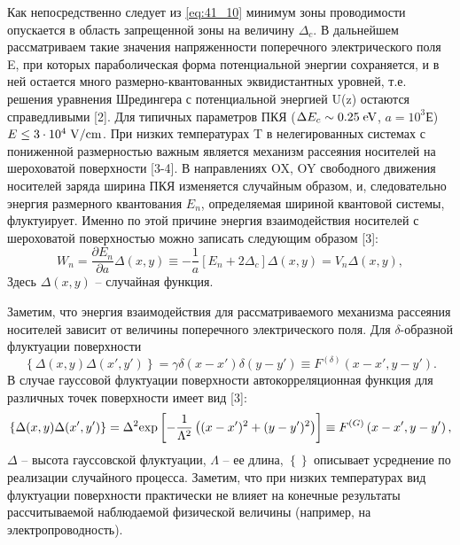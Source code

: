 Как непосредственно следует из \eqref{eq:41_10} минимум зоны проводимости опускается в область запрещенной зоны на величину $\Delta _{c} $. В дальнейшем рассматриваем такие значения напряженности поперечного электрического поля E, при которых параболическая форма потенциальной энергии сохраняется, и в ней остается много размерно-квантованных эквидистантных уровней, т.е. решения уравнения Шредингера с потенциальной энергией U(z) остаются справедливыми [2]. Для типичных параметров ПКЯ ($\Delta E_{c} \sim 0.25{\rm \; eV}$, $a=10^{3} $Е) $E\le 3\cdot 10^{4} {\rm \; V/cm}$. При низких температурах T в нелегированных системах с пониженной размерностью важным является механизм рассеяния носителей на шероховатой поверхности [3-4]. В направлениях OX, OY свободного движения носителей заряда ширина ПКЯ изменяется случайным образом, и, следовательно энергия размерного квантования $E_{n} $, определяемая шириной квантовой системы, флуктуирует. Именно по этой причине энергия взаимодействия носителей с шероховатой поверхностью можно записать следующим образом [3]:
\begin{equation} \label{eq:41_20}
W_{n} =\frac{\partial E_{n} }{\partial a} \Delta (x,y)\equiv -\frac{1}{a} \left[E_{n} +2\Delta _{c} \right]\Delta (x,y)=V_{n} \Delta (x,y),
\end{equation}
Здесь $\Delta (x,y)$ -- случайная функция.

Заметим, что энергия взаимодействия для рассматриваемого механизма рассеяния носителей зависит от величины поперечного электрического поля. Для $\delta $-образной флуктуации поверхности
\begin{equation} \label{eq:41_30}
\left\{\Delta (x,y)\Delta (x',y')\right\}=\gamma \delta (x-x')\delta (y-y')\equiv F^{(\delta )} \left(x-x',y-y'\right).
\end{equation} 
В случае гауссовой флуктуации поверхности автокорреляционная функция для различных точек поверхности имеет вид [3]:
\begin{equation} \label{eq:41_40}
\left\{\Delta (x,y)\Delta (x',y')\right\}=\Delta ^{2} {\rm exp}\left[-\frac{1}{\Lambda ^{2} } \left((x-x')^{2} +(y-y')^{2} \right)\right]\equiv F^{(G)} \left(x-x',y-y'\right),
\end{equation} 
$\Delta $ -- высота гауссовской флуктуации, $\Lambda $ -- ее длина, $\left\{\right\}$ описывает усреднение по реализации случайного процесса. Заметим, что при низких температурах вид флуктуации поверхности практически не влияет на конечные результаты рассчитываемой наблюдаемой физической величины (например, на электропроводность).

